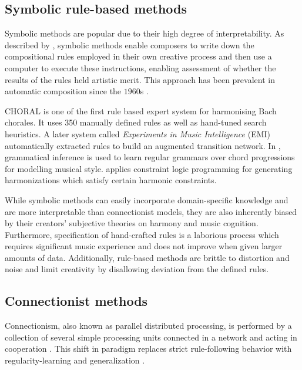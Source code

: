 \subsection{Symbolic rule-based methods}

Symbolic methods are popular due to their high degree of interpretability. As
described by \citet{todd1989connectionist}, symbolic methods enable composers
to write down the compositional rules employed in their own creative process
and then use a computer to execute these instructions, enabling assessment of
whether the results of the rules held artistic merit. This approach has been
prevalent in automatic composition since the $1960$s
\citep{todd1989connectionist}.

CHORAL \citep{ebciouglu1988expert} is one of the first rule based expert system
for harmonising Bach chorales. It uses 350 manually defined rules as well as
hand-tuned search heuristics. A later system called \emph{Experiments in Music
Intelligence} (EMI) \citep{cope1992computer} automatically extracted rules to
build an augmented transition network\citep{wanner1980atn}. In
\citep{cruz1998learning}, grammatical inference is used to learn regular
grammars over chord progressions for modelling musical style.
\citep{tsang1991harmonizing} applies constraint logic programming for generating
harmonizations which satisfy certain harmonic constraints.

While symbolic methods can easily incorporate domain-specific knowledge and are
more interpretable than connectionist models, they are also inherently biased
by their creators' subjective theories on harmony and music cognition.
Furthermore, specification of hand-crafted rules is a laborious process which
requires significant music experience and does not improve when given larger
amounts of data. Additionally, rule-based methods are brittle to distortion and
noise and limit creativity by disallowing deviation from the defined rules.

\subsection{Connectionist methods}

Connectionism, also known as parallel distributed processing, is performed by a
collection of several simple processing units connected in a network and acting
in cooperation \citep{pdp1986parallel}. This shift in paradigm replaces strict
rule-following behavior with regularity-learning and generalization
\citep{dolson1989machine}.

